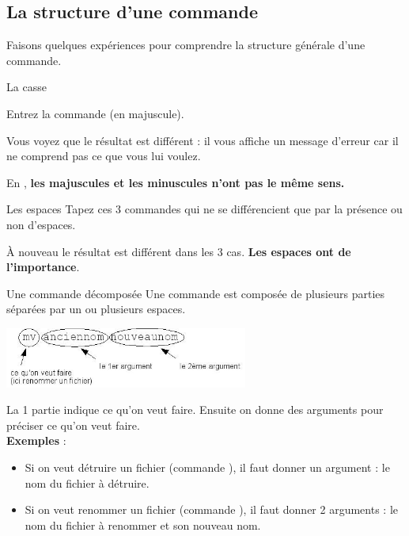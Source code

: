 \documentclass[a4paper,11pt]{style-esi/td}
\begin{document}
	\subsection{La structure d'une commande}

		Faisons quelques expériences pour comprendre
		la structure générale d'une commande.

		\begin{Experience}{La casse} 
			\vspace{-1em}
			\begin{steps}
				\item Entrez la commande  (en majuscule).
			\end{steps}
			Vous voyez que le résultat est différent :
			il vous affiche un message d'erreur 
			car il ne comprend pas ce que vous lui voulez.
			\begin{infobox}
				En \name{Linux}, 
				\textbf{les majuscules et les minuscules n'ont pas le même sens.}
			\end{infobox}
		\end{Experience}	
			
		\begin{Experience}{Les espaces} 
			Tapez ces 3 commandes qui ne se différencient 
			que par la présence ou non d'espaces.
			\begin{steps}
			\item \kbd{ls dev1}
			\item \kbd{lsdev1}
			\item \kbd{ls dev 1}
			\end{steps}
			À nouveau le résultat est différent dans les 3 cas. 
			\textbf{Les espaces ont de l'importance}.
		\end{Experience}				

		\begin{theorie}{Une commande décomposée}
			Une commande est composée de plusieurs parties 
			séparées par un ou plusieurs espaces. 
			\begin{center}
				\includegraphics[width=0.6\textwidth]{images/commande.jpg}
			\end{center}
			La 1\iere{} partie indique ce qu'on veut faire. 
			Ensuite on donne des arguments pour préciser ce qu'on veut faire.
			\\
			\textbf{Exemples} :
			\begin{itemize}
			\item 
				Si on veut détruire un fichier (commande ), 
				il faut donner un argument : le nom du fichier à détruire.
			\item 
				Si on veut renommer un fichier (commande ), 
				il faut donner 2 arguments : 
				le nom du fichier à renommer et son nouveau nom.
			\end{itemize}
		\end{theorie}
\end{document}
